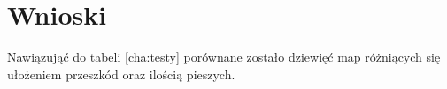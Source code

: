 \chapter{Wnioski}
\label{cha:wnioski}

Nawiązująć do tabeli \ref{cha:testy} porównane zostało dziewięć map różniących się ułożeniem przeszkód oraz ilością pieszych.



